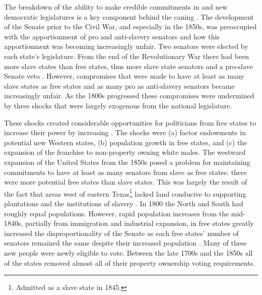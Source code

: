 \documentclass[a4paper]{article}\usepackage[]{graphicx}\usepackage[]{color}
\begin{document}
The breakdown of the ability to make credible commitments in  and new democratic legislatures is a key component behind the caning . The development of the Senate prior to the Civil War, and especially in the 1850s, was preoccupied with the apportionment of pro and anti-slavery senators and how this apportionment was becoming increasingly unfair. Two senators were elected by each state's legislature. From the end of the Revolutionary War there had been more slave states than free states, thus more slave state senators and a pro-slave Senate veto \cite[151]{Weingast1998}. However, compromises that were made to have at least as many slave states as free states and as many pro as anti-slavery senators became increasingly unfair. As the 1800s progressed these compromises were undermined by three shocks that were largely exogenous from the national legislature.

These shocks created considerable opportunities for politicians from free states to increase their power by increasing . The shocks were (a) factor endowments in potential new Western states, (b) population growth in free states, and (c) the expansion of the franchise to non-property owning white males. The westward expansion of the United States from the 1850s posed a problem for maintaining commitments to have at least as many senators from slave as free states: there were more potential free states than slave states. This was largely the result of the fact that areas west of eastern Texas\footnote{Admitted as a slave state in 1845.} lacked land conducive to supporting plantations and the institutions of slavery \cite[]{Ramsdell1929,Weingast1998}. In 1800 the North and South had roughly equal populations. However, rapid population increases from the mid-1840s, partially from immigration and industrial expansion, in free states greatly increased the disproportionality of the Senate as each free states' number of senators remained the same despite their increased population \cite[184]{Weingast1998}. Many of these new people were newly eligible to vote. Between the late 1700s and the 1850s all of the states removed almost all of their property ownership voting requirements.
\end{document}

